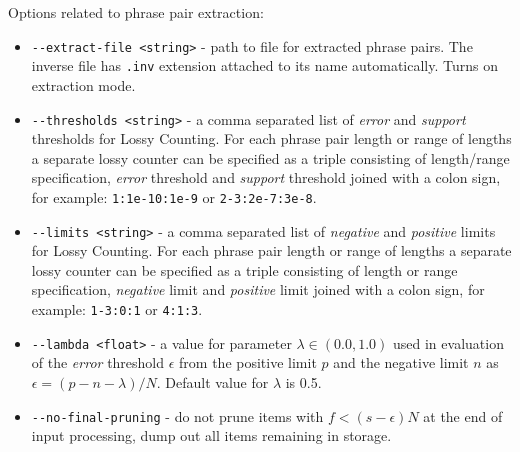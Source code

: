 Options related to phrase pair extraction:
\begin{itemize}
 \item \verb|--extract-file <string>| - path to file for extracted phrase pairs.
  The inverse file has \texttt{.inv} extension attached to its name automatically.
  Turns on extraction mode.
 \item \verb|--thresholds <string>| - a comma separated list of \emph{error} and \emph{support}
  thresholds for Lossy Counting. For each phrase pair length or range of lengths
  a separate lossy counter can be specified as a triple consisting of length/range
  specification, \emph{error} threshold and \emph{support} threshold joined with
  a colon sign, for example: \texttt{1:1e-10:1e-9} or \texttt{2-3:2e-7:3e-8}.
 \item \verb|--limits <string>| - a comma separated list of \emph{negative} and \emph{positive}
  limits for Lossy Counting. For each phrase pair length or range of lengths
  a separate lossy counter can be specified as a triple consisting of length or range
  specification, \emph{negative} limit and \emph{positive} limit joined with
  a colon sign, for example: \texttt{1-3:0:1} or \texttt{4:1:3}.
 \item \verb|--lambda <float>| - a value for parameter $\lambda \in (0.0, 1.0)$
  used in evaluation of the \emph{error} threshold $\epsilon$ from
  the positive limit $p$ and the negative limit $n$ as $\epsilon = (p - n - \lambda) / N$.
  Default value for $\lambda$ is 0.5.
 \item \verb|--no-final-pruning| - do not prune items with $f < (s - \epsilon)N$
  at the end of input processing, dump out all items remaining in storage.
\end{itemize}


